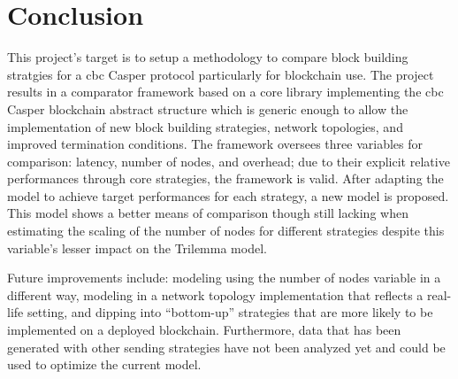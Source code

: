 \chapter{Conclusion}
\label{chap:conclusion}

This project's target is to setup a methodology to compare block building
stratgies for a \gls{cbc} Casper protocol particularly for blockchain use. The
project results in a comparator framework based on a core library implementing
the \gls{cbc} Casper blockchain abstract structure which is generic enough to
allow the implementation of new block building strategies, network topologies,
and improved termination conditions. 
The framework oversees three variables for comparison: latency, number of nodes,
and overhead; due to their explicit relative performances through core
strategies, the framework is valid.
After adapting the model to achieve target performances for each strategy, a new
model is proposed. This model shows a better means of comparison though still
lacking when estimating the scaling of the number of nodes for different
strategies despite this variable's lesser impact on the Trilemma model.

Future improvements include: modeling using the number of nodes variable in a
different way, modeling in a network topology implementation that reflects a
real-life setting, and dipping into ``bottom-up'' strategies that are more
likely to be implemented on a deployed blockchain. Furthermore, data that has been
generated with other sending strategies have not been analyzed yet and could be
used to optimize the current model.

